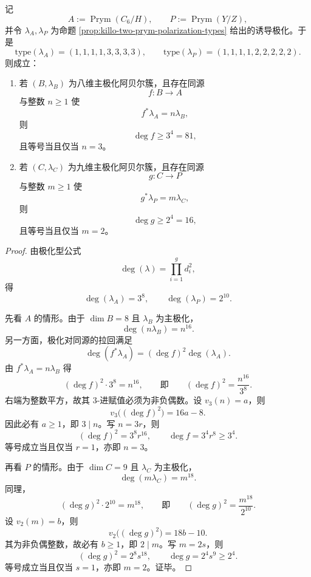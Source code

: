 \begin{conclusion}\label{con:xi-time-part9n-prym-polarization-minimal-isogeny-degree}
记
\[
A:=\operatorname{Prym}(C_6/H),
\qquad
P:=\operatorname{Prym}(Y/Z),
\]
并令 \(\lambda_A,\lambda_P\) 为命题 \ref{prop:killo-two-prym-polarization-types} 给出的诱导极化。于是
\[
\mathrm{type}(\lambda_A)=(1,1,1,1,3,3,3,3),
\qquad
\mathrm{type}(\lambda_P)=(1,1,1,1,2,2,2,2,2).
\]
则成立：
\begin{enumerate}
  \item 若 \((B,\lambda_B)\) 为八维主极化阿贝尔簇，且存在同源
  \[
  f:B\to A
  \]
  与整数 \(n\ge 1\) 使
  \[
  f^*\lambda_A=n\lambda_B,
  \]
  则
  \[
  \deg f\ge 3^4=81,
  \]
  且等号当且仅当 \(n=3\)。
  \item 若 \((C,\lambda_C)\) 为九维主极化阿贝尔簇，且存在同源
  \[
  g:C\to P
  \]
  与整数 \(m\ge 1\) 使
  \[
  g^*\lambda_P=m\lambda_C,
  \]
  则
  \[
  \deg g\ge 2^4=16,
  \]
  且等号当且仅当 \(m=2\)。
\end{enumerate}
\end{conclusion}
\begin{proof}
由极化型公式
\[
\deg(\lambda)=\prod_{i=1}^{g}d_i^2,
\]
得
\[
\deg(\lambda_A)=3^8,
\qquad
\deg(\lambda_P)=2^{10}.
\]

先看 \(A\) 的情形。由于 \(\dim B=8\) 且 \(\lambda_B\) 为主极化，
\[
\deg(n\lambda_B)=n^{16}.
\]
另一方面，极化对同源的拉回满足
\[
\deg(f^*\lambda_A)=(\deg f)^2\deg(\lambda_A).
\]
由 \(f^*\lambda_A=n\lambda_B\) 得
\[
(\deg f)^2\cdot 3^8=n^{16},
\qquad\text{即}\qquad
(\deg f)^2=\frac{n^{16}}{3^8}.
\]
右端为整数平方，故其 \(3\)-进赋值必须为非负偶数。设 \(v_3(n)=a\)，则
\[
v_3\!\bigl((\deg f)^2\bigr)=16a-8.
\]
因此必有 \(a\ge 1\)，即 \(3\mid n\)。写 \(n=3r\)，则
\[
(\deg f)^2=3^8r^{16},
\qquad
\deg f=3^4r^8\ge 3^4.
\]
等号成立当且仅当 \(r=1\)，亦即 \(n=3\)。

再看 \(P\) 的情形。由于 \(\dim C=9\) 且 \(\lambda_C\) 为主极化，
\[
\deg(m\lambda_C)=m^{18}.
\]
同理，
\[
(\deg g)^2\cdot 2^{10}=m^{18},
\qquad\text{即}\qquad
(\deg g)^2=\frac{m^{18}}{2^{10}}.
\]
设 \(v_2(m)=b\)，则
\[
v_2\!\bigl((\deg g)^2\bigr)=18b-10.
\]
其为非负偶整数，故必有 \(b\ge 1\)，即 \(2\mid m\)。写 \(m=2s\)，则
\[
(\deg g)^2=2^8s^{18},
\qquad
\deg g=2^4s^9\ge 2^4.
\]
等号成立当且仅当 \(s=1\)，亦即 \(m=2\)。证毕。
\end{proof}






